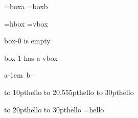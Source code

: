 \documentclass{article}
\begin{document}
\newbox\boxa
\newbox\boxb
\setbox\boxa=\hbox{boxa}
\setbox\boxb=\hbox{boxb}
\the\boxa \copy\boxa

\the\boxb \box\boxb

\box\boxa 
\box\boxb 

=\hbox{hbox}
=\vbox{vbox}


 box-0 is empty\fi

 box-1 has a vbox\fi

a\hbox{\kern-1em b}--



\par

\hbox to 10pt{hello}
\hbox to 20.555pt{hello}
\hbox to 30pt{hello}

\hbox to 20pt{\hss hello}
\hbox to 30pt{\hss hello}
=\hbox{hello}
\end{document}
